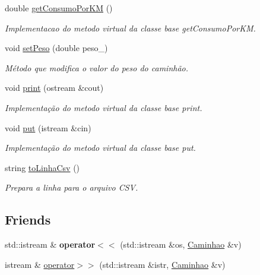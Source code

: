 \begin{DoxyCompactItemize}
double \hyperlink{classCaminhao_a11f7d61727617ffe237ad62ce1ac18ed}{get\+Consumo\+Por\+KM} ()
\begin{DoxyCompactList}\small\item\em Implementacao do metodo virtual da classe base \textquotesingle{}get\+Consumo\+Por\+KM\textquotesingle{}. \end{DoxyCompactList}\item 
void \hyperlink{classCaminhao_a744ca750962ca3fbabe6caeb2ccd7e02}{set\+Peso} (double peso\+\_\+)
\begin{DoxyCompactList}\small\item\em Método que modifica o valor do peso do caminhão. \end{DoxyCompactList}\item 
void \hyperlink{classCaminhao_a5ba8b7a769a300b10595a4aa55ccbf8c}{print} (ostream \&cout)
\begin{DoxyCompactList}\small\item\em Implementação do metodo virtual da classe base \textquotesingle{}print\textquotesingle{}. \end{DoxyCompactList}\item 
void \hyperlink{classCaminhao_a80131907cd5b7ef1d138e70dba4b0c0d}{put} (istream \&cin)
\begin{DoxyCompactList}\small\item\em Implementação do metodo virtual da classe base \textquotesingle{}put\textquotesingle{}. \end{DoxyCompactList}\item 
string \hyperlink{classCaminhao_aabcf701d339872da35d7a2948b474ec3}{to\+Linha\+Csv} ()
\begin{DoxyCompactList}\small\item\em Prepara a linha para o arquivo C\+SV. \end{DoxyCompactList}\end{DoxyCompactItemize}
\subsection*{Friends}
\begin{DoxyCompactItemize}
\item 
\mbox{\label{classCaminhao_ae8288029cdfcdc28216d83e8f5ea2a6d}} 
std\+::istream \& {\bfseries operator$<$$<$} (std\+::istream \&os, \hyperlink{classCaminhao}{Caminhao} \&v)
\item 
istream \& \hyperlink{classCaminhao_a8b4c2cf9aa77fc48a4c2b68bd052b512}{operator$>$$>$} (std\+::istream \&istr, \hyperlink{classCaminhao}{Caminhao} \&v)
\end{DoxyCompactItemize}
